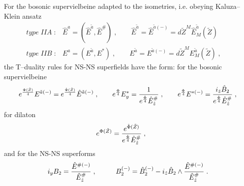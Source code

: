 \documentclass[a4paper,11pt]{article}
\begin{document}
For the bosonic supervielbeine adapted to the isometries,  
i.e. obeying Kaluza--Klein ansatz \cite{ansatz}
 \begin{eqnarray}\label{KKA}
& type \; IIA \; : & \hat{E}^{\hat{a}}= (\hat{E}^{\tilde{a}}, \hat{E}^{\#}) 
\; , \qquad 
\hat{E}^{ {\tilde{a}}}= \hat{E}^{ {\tilde{a}}(-)}=
d\tilde{Z}^M \hat{E}^{ {\tilde{a}}}_M(\tilde{Z}) \qquad 
\\ \label{KKB} & type \; IIB \; : & 
E^a = ({E}^{\tilde{a}}, {E}^{*}) \; , \qquad 
{E}^{ {\tilde{a}}}= {E}^{ {\tilde{a}}(-)} = 
d\tilde{Z}^M  {E}^{ {\tilde{a}}}_M(\tilde{Z}) \; , \qquad 
\end{eqnarray}
the T--duality rules for 
NS-NS superfields have the form: for the bosonic supervielbeine 
\begin{eqnarray}\label{Ts1}
e^{{\Phi(\tilde{Z})\over 4}} E^{ {\tilde{a}}(-)} =  
e^{{\hat{\Phi}(\tilde{Z})\over 4}}\hat{E}^{ {\tilde{a}}(-)} \; , 
\qquad 
e^{{\Phi\over 4}} E_y^{ {*}}= {1\over 
e^{{\hat{\Phi}\over 4}} 
\hat{E}_{\hat{z}}^{ {\#}}}\; , 
\qquad  
e^{{\Phi\over 4}} E^{ {*}(-)}= {i_{\hat{z}} 
\hat{B}_2 \over e^{{\hat{\Phi}\over 4}} \hat{E}_{\hat{z}}^{ {\#}}} \; , 
\end{eqnarray}
for dilaton 
\begin{eqnarray}\label{Ts1P}
e^{{\Phi}(\tilde{Z})} = {e^{\hat{\Phi}(\tilde{Z})}\over 
e^{{\hat{\Phi}\over 4}} 
\hat{E}_{\hat{z}}^{ {\#}}} \; , 
\qquad 
\end{eqnarray}
and for the NS-NS superforms
\begin{eqnarray}\label{Ts2} 
i_yB_2 = {\hat{E}^{ {\#}(-)}\over 
\hat{E}_{\hat{z}}^{ {\#}}} \; , 
\qquad && 
B_2^{(-)}= \hat{B}^{(-)}_2 - i_{\hat{z}}\hat{B}_2\wedge 
 {\hat{E}^{ {\#}(-)}\over \hat{E}_{\hat{z}}^{ {\#}}} \; . 
\end{eqnarray}
\end{document}
